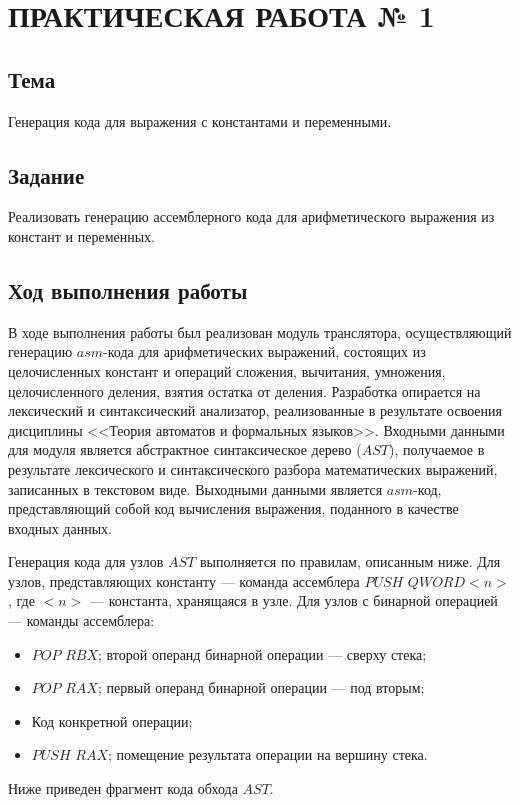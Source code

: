 \chapter{ПРАКТИЧЕСКАЯ РАБОТА № 1}

\section{Тема}

Генерация кода для выражения с константами и переменными.

\section{Задание}

Реализовать генерацию ассемблерного кода для арифметического выражения из констант и переменных.

\section{Ход выполнения работы}

В ходе выполнения работы был реализован модуль транслятора, осуществляющий генерацию $asm$-кода для арифметических выражений, состоящих из целочисленных констант и операций сложения, вычитания, умножения, целочисленного деления, взятия остатка от деления. Разработка опирается на лексический и синтаксический анализатор, реализованные в результате освоения дисциплины <<Теория автоматов и формальных языков>>. Входными данными для модуля является абстрактное синтаксическое дерево ($AST$), получаемое в результате лексического и синтаксического разбора математических выражений, записанных в текстовом виде. Выходными данными является $asm$-код, представляющий собой код вычисления выражения, поданного в качестве входных данных.

Генерация кода для узлов $AST$ выполняется по правилам, описанным ниже. Для узлов, представляющих константу --- команда ассемблера $PUSH$ $QWORD <n>$, где $<n>$ --- константа, хранящаяся в узле. Для узлов с бинарной операцией --- команды ассемблера:

\begin{itemize}
	\item{$POP$ $RBX$; второй операнд бинарной операции --- сверху стека;}
	\item{$POP$ $RAX$; первый операнд бинарной операции --- под вторым;}
	\item{Код конкретной операции;}
	\item{$PUSH$ $RAX$; помещение результата операции на вершину стека.}
\end{itemize}
Ниже приведен фрагмент кода обхода $AST$.

